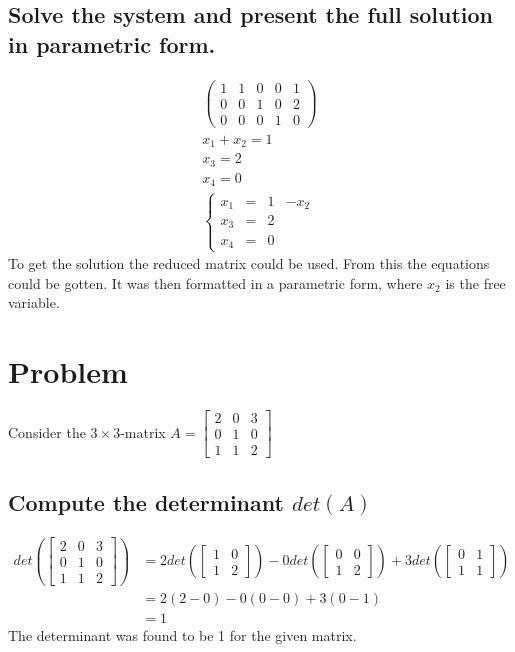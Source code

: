 \documentclass[12pt, a4paper]{article}
\begin{document}
		\subsection{Solve the system and present the full solution in parametric form.}
			\begin{align}
				\left(
				    \begin{array}{cccc|c}
				    1&1&0&0&1\\ 
				    0&0&1&0&2\\
				    0&0&0&1&0
				    \end{array}
				\right)\\
				x_1+x_2=1\\
				x_3=2\\
				x_4=0\\
				\left\{
				\begin{array}{cccc}
					x_1&=&1&-x_2\\
					x_3&=&2&\\
					x_4&=&0&
				\end{array}	
				\right.		
			\end{align}
			To get the solution the reduced matrix could be used. From this the equations could be gotten. It was then formatted in a parametric form, where $x_2$ is the free variable.
	\clearpage
	\section{Problem}
		Consider the $3\times 3$-matrix $A=\begin{bmatrix}2&0&3\\0&1&0\\1&1&2\end{bmatrix}$
		\subsection{Compute the determinant $det(A)$}
			\begin{align*}
				det\left(\begin{bmatrix}2&0&3\\0&1&0\\1&1&2\end{bmatrix}\right)&=2det\left(\begin{bmatrix}1&0\\1&2\end{bmatrix}\right)-0det\left(\begin{bmatrix}0&0\\1&2\end{bmatrix}\right)+3det\left(\begin{bmatrix}0&1\\1&1\end{bmatrix}\right)\\
				&=2(2-0)-0(0-0)+3(0-1)\\
				&=1
			\end{align*}
			The determinant was found to be 1 for the given matrix.
\end{document}
